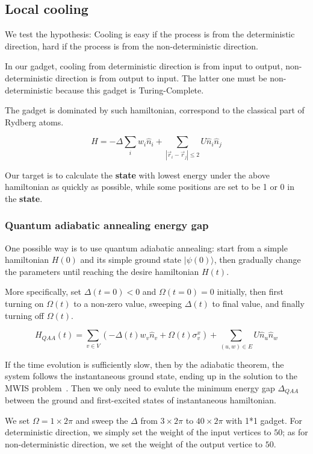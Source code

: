 \documentclass[twocolumn,superscriptaddress,english,showpacs,longbibliography]{revtex4-2}
\begin{document}
\subsection{Local cooling}\label{local-cooling}

We test the hypothesis: Cooling is easy if the process is from the
deterministic direction, hard if the process is from the
non-deterministic direction.

In our gadget, cooling from deterministic direction is from input to
output, non-deterministic direction is from output to input. The latter
one must be non-deterministic because this gadget is Turing-Complete.

The gadget is dominated by such hamiltonian, correspond to the classical
part of Rydberg atoms.

\[
H = -\Delta \sum_i w_i \hat n_i + \sum_{|\vec r_i - \vec r_j|\leq 2} U \hat n_i \hat n_j
\]

Our target is to calculate the \textbf{state} with lowest energy under
the above hamiltonian as quickly as possible, while some positions are
set to be 1 or 0 in the \textbf{state}.

\subsubsection{Quantum adiabatic annealing energy
gap}\label{quantum-adiabatic-annealing-energy-gap}

One possible way is to use quantum adiabatic annealing: start from a
simple hamiltonian $H(0)$ and its simple ground state
$|\psi(0)\rangle$, then gradually change the parameters until reaching
the desire hamiltonian $H(t)$.

More specifically, set $\Delta(t=0) <0$ and $\Omega(t=0) =0$
initially, then first turning on $\Omega(t)$ to a non-zero value,
sweeping $\Delta(t)$ to final value, and finally turning off
$\Omega(t)$.

\[
H_{QAA}(t) = \sum_{v\in V} (-\Delta(t)w_v \hat n_v + \Omega(t)\sigma_{v}^x) + \sum_{(u,w) \in E} U\hat n_u \hat n_w
\]

If the time evolution is sufficiently slow, then by the adiabatic
theorem, the system follows the instantaneous ground state, ending up in
the solution to the MWIS problem~\cite{Pichler2018}.
Then we only need to evalute
the minimum energy gap $\Delta_{QAA}$ between the ground and
first-excited states of instantaneous hamiltonian.

We set $\Omega = 1 \times 2\pi$ and sweep the $\Delta$ from $3
\times 2\pi$ to $40 \times 2\pi$ with 1*1 gadget. For deterministic
direction, we simply set the weight of the input vertices to $50$; as
for non-deterministic direction, we set the weight of the output vertice
to $50$.
\end{document}

